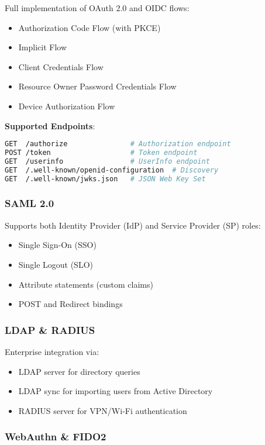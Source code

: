 \documentclass[11pt,a4paper]{article}
\begin{document}
Full implementation of OAuth 2.0 \cite{rfc6749} and OIDC \cite{oidc} flows:

\begin{itemize}
  \item Authorization Code Flow (with PKCE)
  \item Implicit Flow
  \item Client Credentials Flow
  \item Resource Owner Password Credentials Flow
  \item Device Authorization Flow
\end{itemize}

\textbf{Supported Endpoints}:
\begin{lstlisting}[language=bash]
GET  /authorize               # Authorization endpoint
POST /token                   # Token endpoint
GET  /userinfo                # UserInfo endpoint
GET  /.well-known/openid-configuration  # Discovery
GET  /.well-known/jwks.json   # JSON Web Key Set
\end{lstlisting}

\subsubsection{SAML 2.0}

Supports both Identity Provider (IdP) and Service Provider (SP) roles:

\begin{itemize}
  \item Single Sign-On (SSO)
  \item Single Logout (SLO)
  \item Attribute statements (custom claims)
  \item POST and Redirect bindings
\end{itemize}

\subsubsection{LDAP \& RADIUS}

Enterprise integration via:
\begin{itemize}
  \item LDAP server for directory queries
  \item LDAP sync for importing users from Active Directory
  \item RADIUS server for VPN/Wi-Fi authentication
\end{itemize}

\subsubsection{WebAuthn \& FIDO2}
\end{document}
